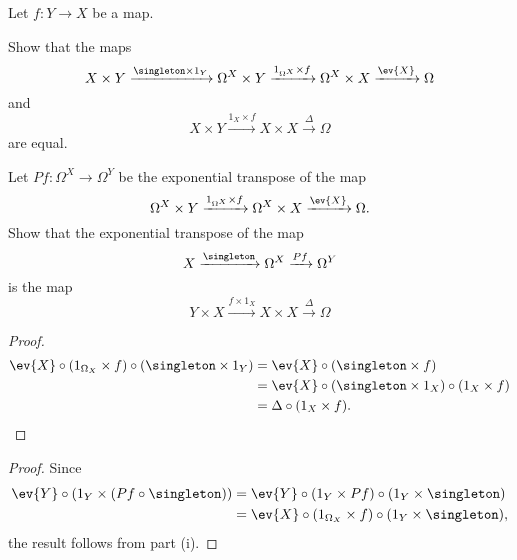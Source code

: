 \begin{exercise}{3}
    Let $f\colon Y\to X$ be a map.
    \begin{exercises}
        \item Show that the maps
            \[X\times Y\xrightarrow{\singleton\times 1_Y}\Omega^X\times Y\xrightarrow{1_{\Omega^X}\times f}\Omega^X\times X\xrightarrow{\ev{X}}\Omega\]
            and
            \[X\times Y\xrightarrow{1_X\times f}X\times X\xrightarrow{\Delta}\Omega\]
            are equal.
        \item Let $Pf\colon\Omega^X\to\Omega^Y$ be the exponential transpose of the map
            \[\Omega^X\times Y\xrightarrow{1_{\Omega^X}\times f}\Omega^X\times X\xrightarrow{\ev{X}}\Omega.\]
            Show that the exponential transpose of the map
            \[X\xrightarrow{\singleton}\Omega^X\xrightarrow{Pf}\Omega^Y\]
            is the map
            \[Y\times X\xrightarrow{f\times 1_X}X\times X\xrightarrow{\Delta}\Omega\]
    \end{exercises}
    \begin{solution}
        \begin{exercises}
            \item\begin{proof}
                \begin{align*}
                    \ev{X}\circ (1_{\Omega_X}\times f) \circ(\singleton\times 1_Y)&=\ev{X}\circ(\singleton\times f)\\
                    &=\ev{X}\circ(\singleton\times 1_X)\circ(1_X\times f)\\
                    &=\Delta\circ(1_X\times f).
                \end{align*}
            \end{proof}
            \item\begin{proof}
                Since
                \begin{align*}
                    \ev{Y}\circ\left(1_Y\times(Pf\circ\singleton)\right)&=\ev{Y}\circ(1_Y\times Pf)\circ(1_Y\times \singleton)\\
                    &=\ev{X}\circ(1_{\Omega_X}\times f)\circ(1_Y\times\singleton),
                \end{align*}
                the result follows from part (i).
            \end{proof}
        \end{exercises}
    \end{solution}
\end{exercise}

